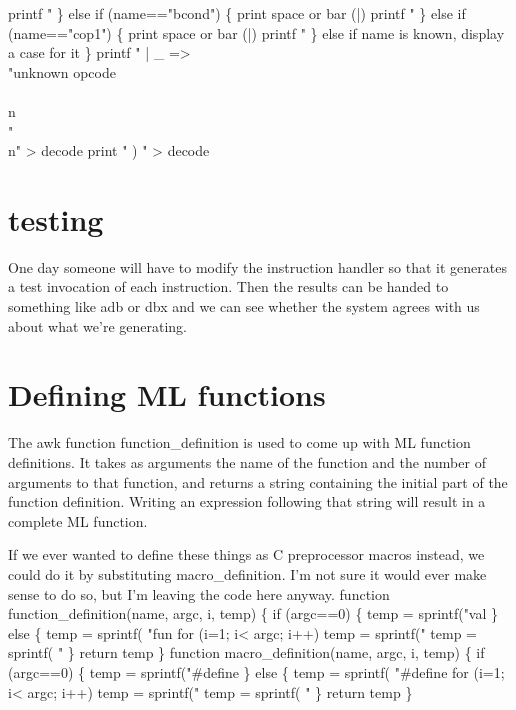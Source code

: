                 printf "%
        \} else if (name=="bcond") \{
                \LA{}print space or bar (\code{}|\edoc{})\RA{}
                printf "%
        \} else if (name=="cop1") \{
                \LA{}print space or bar (\code{}|\edoc{})\RA{}
                printf "%
        \} else \LA{}if \code{}name\edoc{} is known, display a case for it\RA{}
\}
printf " | _ => \\"unknown opcode\\\\n\\"\\n" > decode
print "   ) " > decode
\endcode
{}
\section{testing}
One day someone will have to modify the instruction handler so that
it generates a test invocation of each instruction.
Then the results can be handed to something like adb or dbx and we can
see whether the system agrees with us about what we're generating.

\enddocs
{}
\section{Defining ML functions}
The awk function \code{}function_definition\edoc{} is used to
come up with ML function definitions.
It takes as arguments the name of the function and the number of arguments
to that function, and returns a string containing the initial part of
the function definition.
Writing an expression following that string will result in a complete
ML function.

If we ever wanted to define these things as C preprocessor macros instead,
we could do it by substituting \code{}macro_definition\edoc{}.
I'm not sure it would ever make sense to do so, but I'm leaving the
code here anyway.
\enddocs
{}
\endmoddef
function function_definition(name, argc,  i, temp) \{
        if (argc==0) \{
                temp = sprintf("val %
        \} else \{
                temp = sprintf( "fun %
                for (i=1; i< argc; i++) temp = sprintf("%
                temp = sprintf( "%
        \}
        return temp
\}
\endcode
{}
\endmoddef
function macro_definition(name, argc,  i, temp) \{
        if (argc==0) \{
                temp = sprintf("#define %
        \} else \{
                temp = sprintf( "#define %
                for (i=1; i< argc; i++) temp = sprintf("%
                temp = sprintf( "%
        \}
        return temp
\}
\endcode
{}
